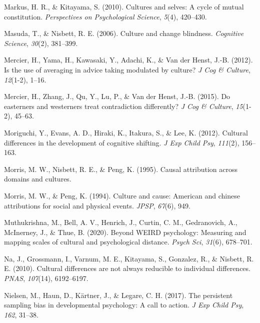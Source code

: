 \documentclass[
  man]{apa6}
\newlength{\cslhangindent}
\newlength{\cslentryspacingunit} %
\newenvironment{CSLReferences}[2] %
 {%
  \setlength{\parindent}{0pt}
  \ifodd #1
  \let\oldpar\par
  \def\par{\hangindent=\cslhangindent\oldpar}
  \fi
  \setlength{\parskip}{#2\cslentryspacingunit}
 }%
 {}
\begin{document}
\begin{CSLReferences}{1}{0}
\leavevmode{}%
Markus, H. R., \& Kitayama, S. (2010). Cultures and selves: A cycle of mutual constitution. \emph{Perspectives on Psychological Science}, \emph{5}(4), 420--430.

\leavevmode{}%
Masuda, T., \& Nisbett, R. E. (2006). Culture and change blindness. \emph{Cognitive Science}, \emph{30}(2), 381--399.

\leavevmode{}%
Mercier, H., Yama, H., Kawasaki, Y., Adachi, K., \& Van der Henst, J.-B. (2012). Is the use of averaging in advice taking modulated by culture? \emph{J Cog \& Culture}, \emph{12}(1-2), 1--16.

\leavevmode{}%
Mercier, H., Zhang, J., Qu, Y., Lu, P., \& Van der Henst, J.-B. (2015). Do easterners and westerners treat contradiction differently? \emph{J Cog \& Culture}, \emph{15}(1-2), 45--63.

\leavevmode{}%
Moriguchi, Y., Evans, A. D., Hiraki, K., Itakura, S., \& Lee, K. (2012). Cultural differences in the development of cognitive shifting. \emph{J Exp Child Psy}, \emph{111}(2), 156--163.

\leavevmode{}%
Morris, M. W., Nisbett, R. E., \& Peng, K. (1995). Causal attribution across domains and cultures.

\leavevmode{}%
Morris, M. W., \& Peng, K. (1994). Culture and cause: American and chinese attributions for social and physical events. \emph{JPSP}, \emph{67}(6), 949.

\leavevmode{}%
Muthukrishna, M., Bell, A. V., Henrich, J., Curtin, C. M., Gedranovich, A., McInerney, J., \& Thue, B. (2020). Beyond WEIRD psychology: Measuring and mapping scales of cultural and psychological distance. \emph{Psych Sci}, \emph{31}(6), 678--701.

\leavevmode{}%
Na, J., Grossmann, I., Varnum, M. E., Kitayama, S., Gonzalez, R., \& Nisbett, R. E. (2010). Cultural differences are not always reducible to individual differences. \emph{PNAS}, \emph{107}(14), 6192--6197.

\leavevmode{}%
Nielsen, M., Haun, D., Kärtner, J., \& Legare, C. H. (2017). The persistent sampling bias in developmental psychology: A call to action. \emph{J Exp Child Psy}, \emph{162}, 31--38.


\end{CSLReferences}
\end{document}
